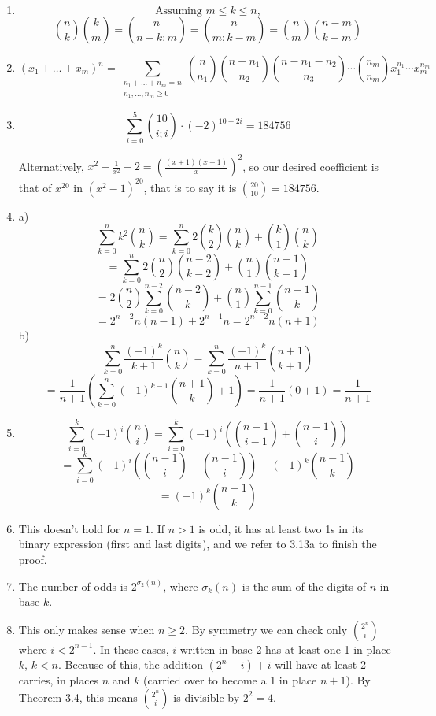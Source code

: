 \documentclass{book}
\numberwithin{equation}{section}
\begin{document}
\begin{enumerate}[label={3.\arabic*}]

\item
$$\text{Assuming } m \leq k \leq n \text{,}$$
$${n \choose k}{k \choose m} = {n \choose n-k;m} = {n \choose m;k-m}
= {n \choose m}{n-m \choose k-m}$$

\item
$$(x_1 + \ldots + x_m)^n = \sum_{\substack{n_1 + \ldots + n_m = n \\ n_1, \ldots, n_m \geq 0}}
{n \choose n_1}{n-n_1 \choose n_2}{n-n_1-n_2 \choose n_3}\cdots{n_m \choose n_m}x_1^{n_1} \cdots x_m^{n_m}$$

\item
$$\sum_{i=0}^5 {10 \choose i;i}\cdot (-2)^{10-2i} = 184756$$

Alternatively, $x^2 + \frac{1}{x^2} - 2 = (\frac{(x+1)(x-1)}{x})^2$, so our desired
coefficient is that of $x^{20}$ in $(x^2 - 1)^{20}$, that is to say it is ${20 \choose 10} = 184756$.

\item
a)
$$\sum_{k=0}^n k^2 {n \choose k} = \sum_{k=0}^n 2{k \choose 2}{n \choose k} + {k \choose 1}{n \choose k}$$
$$= \sum_{k=0}^n 2{n \choose 2}{n-2 \choose k-2} + {n \choose 1}{n-1 \choose k-1}$$
$$= 2{n \choose 2}\sum_{k=0}^{n-2} {n-2 \choose k} + {n \choose 1}\sum_{k=0}^{n-1} {n-1 \choose k}$$
$$= 2^{n-2}n(n-1) + 2^{n-1}n = 2^{n-2}n(n+1)$$
b)
$$\sum_{k=0}^n \frac{(-1)^k}{k+1} {n \choose k} = \sum_{k=0}^n \frac{(-1)^k}{n+1} {n+1 \choose k+1}$$
$$= \frac{1}{n+1} \left( \sum_{k=0}^n (-1)^{k-1} {n+1 \choose k} + 1 \right) = \frac{1}{n+1}(0 + 1) = \frac{1}{n+1}$$

\item
$$\sum_{i=0}^k (-1)^i {n \choose i} = \sum_{i=0}^k (-1)^i \left({n-1 \choose i-1} + {n-1 \choose i} \right)$$
$$= \sum_{i=0}^k (-1)^i \left({n-1 \choose i} - {n-1 \choose i} \right) + (-1)^k {n-1 \choose k}$$
$$= (-1)^k {n-1 \choose k}$$

\item
This doesn't hold for $n=1$. If $n>1$ is odd, it has at least two 1s in its binary expression (first and last digits),
and we refer to 3.13a to finish the proof.

\item
The number of odds is $2^{\sigma_2 (n)}$, where $\sigma_k (n)$ is the sum of the digits of $n$ in base $k$.

\item
This only makes sense when $n \geq 2$. By symmetry we can check only ${2^n \choose i}$ where
$i < 2^{n-1}$. In these cases, $i$ written in base 2 has at least one 1 in place $k$, $k < n$. Because of this,
the addition $(2^n - i) + i$ will have at least 2 carries, in places $n$ and $k$ (carried over to become a 1 in place $n+1$).
By Theorem 3.4, this means ${2^n \choose i}$ is divisible by $2^2 = 4$.


\end{enumerate}
\end{document}
